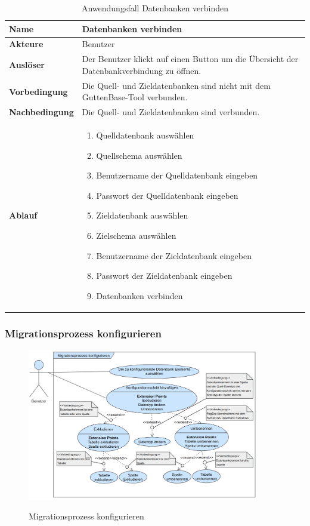 \begin{table}[H]
	\centering
	\begin{tabular}{ |p{4cm}|p{8cm}| }
		\hline
		\textbf{Name} & Datenbanken verbinden  \\
		\hline
		\textbf{Akteure} & Benutzer  \\
		\hline
		\textbf{Auslöser} & Der Benutzer klickt auf einen Button um die Übersicht der Datenbankverbindung zu öffnen. \\
		\hline
		\textbf{Vorbedingung} & Die Quell- und Zieldatenbanken sind nicht mit dem GuttenBase-Tool verbunden.\\
		\hline
		\textbf{Nachbedingung} & Die Quell- und Zieldatenbanken sind verbunden.  \\
		\hline
		\textbf{Ablauf} &  
		\begin{enumerate}
			\item Quelldatenbank auswählen
			\item Quellschema auswählen
			\item Benutzername der Quelldatenbank eingeben
			\item Passwort der Quelldatenbank eingeben
			\item Zieldatenbank auswählen
			\item Zielschema auswählen
			\item Benutzername der Zieldatenbank eingeben
			\item Passwort der Zieldatenbank eingeben
			\item Datenbanken verbinden
		\end{enumerate}  \\
		\hline
		
	\end{tabular}
	\caption{Anwendungsfall Datenbanken verbinden}
	\label{table:db-verbinden}
\end{table}


\subsubsection*{Migrationsprozess konfigurieren}
\begin{figure}[H]
	\caption{Migrationsprozess konfigurieren}
	\centering
	\includegraphics[width=0.9\textwidth]{images/af/af-mg-cfg}
	\label{img:af-mg-cfg}
\end{figure}

